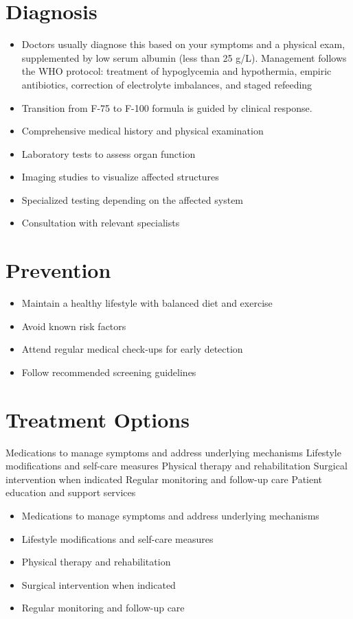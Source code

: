 \section{Diagnosis}
\begin{itemize}[noitemsep]
  \item Doctors usually diagnose this based on your symptoms and a physical exam, supplemented by low serum albumin (less than 25 g/L). Management follows the WHO protocol: treatment of hypoglycemia and hypothermia, empiric antibiotics, correction of electrolyte imbalances, and staged refeeding
  \item Transition from F-75 to F-100 formula is guided by clinical response.
  \item Comprehensive medical history and physical examination
  \item Laboratory tests to assess organ function
  \item Imaging studies to visualize affected structures
  \item Specialized testing depending on the affected system
  \item Consultation with relevant specialists
\end{itemize}
\section{Prevention}
\begin{itemize}[noitemsep]
  \item Maintain a healthy lifestyle with balanced diet and exercise
  \item Avoid known risk factors
  \item Attend regular medical check-ups for early detection
  \item Follow recommended screening guidelines
\end{itemize}
\section{Treatment Options}
Medications to manage symptoms and address underlying mechanisms Lifestyle modifications and self-care measures Physical therapy and rehabilitation Surgical intervention when indicated Regular monitoring and follow-up care Patient education and support services

\begin{itemize}[noitemsep]
  \item Medications to manage symptoms and address underlying mechanisms
  \item Lifestyle modifications and self-care measures
  \item Physical therapy and rehabilitation
  \item Surgical intervention when indicated
  \item Regular monitoring and follow-up care
\end{itemize}
